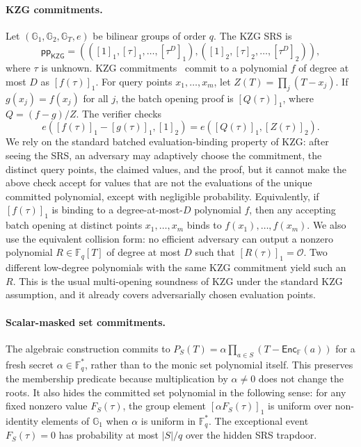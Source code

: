 \documentclass[runningheads]{llncs}
\newcommand{\F}{\mathbb{F}}
\newcommand{\G}{\mathbb{G}}
\newcommand{\GT}{\mathbb{G}_T}
\newcommand{\Enc}{\mathsf{Enc}}
\newcommand{\KZG}{\mathsf{KZG}}
\newcommand{\pp}{\mathsf{pp}}
\begin{document}
\paragraph{KZG commitments.}
Let \((\G_1,\G_2,\GT,e)\) be bilinear groups of order \(q\).  The KZG SRS is
\[
\pp_{\KZG}=(([1]_1,[\tau]_1,\ldots,[\tau^D]_1),([1]_2,[\tau]_2,\ldots,[\tau^D]_2)),
\]
where \(\tau\) is unknown.  KZG commitments~\cite{KZG10} commit to a polynomial \(f\) of degree at most \(D\) as \([f(\tau)]_1\).  For query points \(x_1,\ldots,x_m\), let \(Z(T)=\prod_j(T-x_j)\).  If \(g(x_j)=f(x_j)\) for all \(j\), the batch opening proof is \([Q(\tau)]_1\), where \(Q=(f-g)/Z\).  The verifier checks
\[
        e([f(\tau)]_1-[g(\tau)]_1,[1]_2)=e([Q(\tau)]_1,[Z(\tau)]_2).
\]
We rely on the standard batched evaluation-binding property of KZG: after seeing the SRS, an adversary may adaptively choose the commitment, the distinct query points, the claimed values, and the proof, but it cannot make the above check accept for values that are not the evaluations of the unique committed polynomial, except with negligible probability.  Equivalently, if \([f(\tau)]_1\) is binding to a degree-at-most-\(D\) polynomial \(f\), then any accepting batch opening at distinct points \(x_1,\ldots,x_m\) binds to \(f(x_1),\ldots,f(x_m)\).  We also use the equivalent collision form: no efficient adversary can output a nonzero polynomial \(R\in\F_q[T]\) of degree at most \(D\) such that \([R(\tau)]_1=\mathcal O\).  Two different low-degree polynomials with the same KZG commitment yield such an \(R\).  This is the usual multi-opening soundness of KZG under the standard KZG assumption, and it already covers adversarially chosen evaluation points.

\paragraph{Scalar-masked set commitments.}
The algebraic construction commits to \(P_S(T)=\alpha\prod_{a\in S}(T-\Enc_{\F}(a))\) for a fresh secret \(\alpha\in\F_q^*\), rather than to the monic set polynomial itself.  This preserves the membership predicate because multiplication by \(\alpha\ne0\) does not change the roots.  It also hides the committed set polynomial in the following sense: for any fixed nonzero value \(F_S(\tau)\), the group element \([\alpha F_S(\tau)]_1\) is uniform over non-identity elements of \(\G_1\) when \(\alpha\) is uniform in \(\F_q^*\).  The exceptional event \(F_S(\tau)=0\) has probability at most \(|S|/q\) over the hidden SRS trapdoor.
\end{document}
